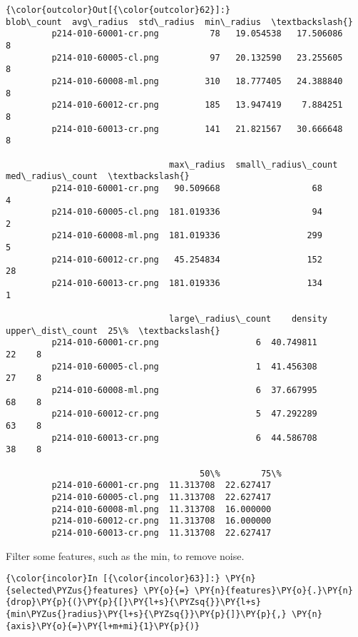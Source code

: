             \begin{Verbatim}[commandchars=\\\{\}]
{\color{outcolor}Out[{\color{outcolor}62}]:}                        blob\_count  avg\_radius  std\_radius  min\_radius  \textbackslash{}
         p214-010-60001-cr.png          78   19.054538   17.506086           8
         p214-010-60005-cl.png          97   20.132590   23.255605           8
         p214-010-60008-ml.png         310   18.777405   24.388840           8
         p214-010-60012-cr.png         185   13.947419    7.884251           8
         p214-010-60013-cr.png         141   21.821567   30.666648           8

                                max\_radius  small\_radius\_count  med\_radius\_count  \textbackslash{}
         p214-010-60001-cr.png   90.509668                  68                 4
         p214-010-60005-cl.png  181.019336                  94                 2
         p214-010-60008-ml.png  181.019336                 299                 5
         p214-010-60012-cr.png   45.254834                 152                28
         p214-010-60013-cr.png  181.019336                 134                 1

                                large\_radius\_count    density  upper\_dist\_count  25\%  \textbackslash{}
         p214-010-60001-cr.png                   6  40.749811                22    8
         p214-010-60005-cl.png                   1  41.456308                27    8
         p214-010-60008-ml.png                   6  37.667995                68    8
         p214-010-60012-cr.png                   5  47.292289                63    8
         p214-010-60013-cr.png                   6  44.586708                38    8

                                      50\%        75\%
         p214-010-60001-cr.png  11.313708  22.627417
         p214-010-60005-cl.png  11.313708  22.627417
         p214-010-60008-ml.png  11.313708  16.000000
         p214-010-60012-cr.png  11.313708  16.000000
         p214-010-60013-cr.png  11.313708  22.627417
\end{Verbatim}

    Filter some features, such as the min, to remove noise.

    \begin{Verbatim}[commandchars=\\\{\}]
{\color{incolor}In [{\color{incolor}63}]:} \PY{n}{selected\PYZus{}features} \PY{o}{=} \PY{n}{features}\PY{o}{.}\PY{n}{drop}\PY{p}{(}\PY{p}{[}\PY{l+s}{\PYZsq{}}\PY{l+s}{min\PYZus{}radius}\PY{l+s}{\PYZsq{}}\PY{p}{]}\PY{p}{,} \PY{n}{axis}\PY{o}{=}\PY{l+m+mi}{1}\PY{p}{)}
\end{Verbatim}

